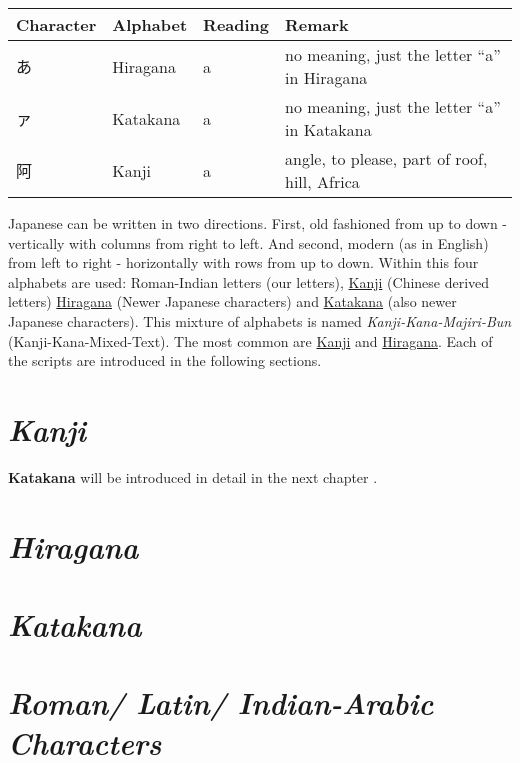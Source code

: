 \begin{center}
\begin{tabular}{|l|l|l|l|}
\textbf{Character}&\textbf{Alphabet}&\textbf{Reading}&\textbf{Remark}\\\hline
あ& Hiragana & a & no meaning, just the letter  ``a'' in Hiragana \\
ァ& Katakana & a & no meaning, just the letter ``a'' in Katakana \\
阿& Kanji    & a & { angle, to please, part of roof, hill, Africa}\\
\end{tabular}
\end{center}

Japanese can be written in two directions. First, old fashioned from up to down
- vertically with columns from right to left. And second, modern (as in
  English) from left to right - horizontally with rows from up to down. Within
  this four alphabets are used: Roman-Indian letters (our letters),
  \hyperref[sec:Kanji]{Kanji} (Chinese derived letters)
  \hyperref[sec:Hiragana]{Hiragana} (Newer Japanese characters) and
   \hyperref[sec:Katakana]{Katakana}  (also newer Japanese characters).  This
  mixture of alphabets is named \textit{Kanji-Kana-Majiri-Bun}
  (Kanji-Kana-Mixed-Text). The most common are \hyperref[sec:Kanji]{Kanji} and
  \hyperref[sec:Hiragana]{Hiragana}. Each of the scripts are introduced in the
  following sections.

\section*{\textit{Kanji}} 


\textbf{Katakana} will be introduced in detail in the next chapter
.

\section*{\textit{Hiragana}}


\section*{\textit{Katakana}}


\section*{\textit{Roman/ Latin/ Indian-Arabic Characters}}


